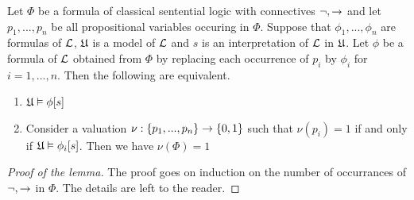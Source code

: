 \begin{lemma}\label{lemma:classical_sentential_logic_holds_in_models}
Let $\Phi$ be a formula of classical sentential logic with connectives $\neg, \rightarrow$ and let $p_1,...,p_n$ be all propositional variables occuring in $\Phi$. Suppose that $\phi_1,...,\phi_n$ are formulas of ${\mathcal L}$, ${\mathfrak U}$ is a model of ${\mathcal L}$ and $s$ is an interpretation of ${\mathcal L}$ in ${\mathfrak U}$. Let $\phi$ be a formula of ${\mathcal L}$ obtained from $\Phi$ by replacing each occurrence of $p_i$ by $\phi_i$ for $i = 1, ..., n$. Then the following are equivalent.
\begin{enumerate}[label=\textbf{\emph{(\roman*)}}, leftmargin=3.0em]
\item ${\mathfrak U} \vDash \phi[s]$
\item Consider a valuation $\nu:\{p_1,...,p_n\} \rightarrow \{0, 1\}$ such that $\nu(p_i) = 1$ if and only if ${\mathfrak U} \vDash \phi_i[s]$. Then we have $\nu(\Phi) = 1$
\end{enumerate}
\end{lemma}
\begin{proof}[Proof of the lemma]
The proof goes on induction on the number of occurrances of $\neg, \rightarrow$ in $\Phi$. The details are left to the reader.
\end{proof}

